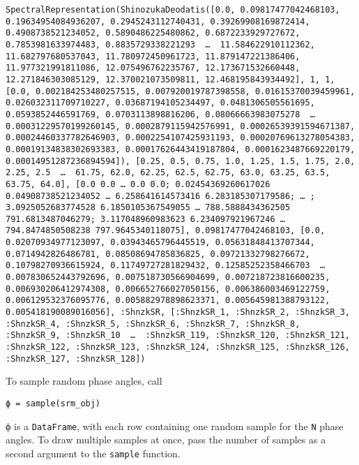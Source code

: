 \begin{verbatim}
SpectralRepresentation(ShinozukaDeodatis([0.0, 0.09817477042468103, 0.19634954084936207, 0.2945243112740431, 0.39269908169872414, 0.4908738521234052, 0.5890486225480862, 0.6872233929727672, 0.7853981633974483, 0.8835729338221293  …  11.584622910112362, 11.682797680537043, 11.780972450961723, 11.879147221386406, 11.977321991811086, 12.075496762235767, 12.173671532660448, 12.271846303085129, 12.370021073509811, 12.468195843934492], 1, 1, [0.0, 0.002184253480257515, 0.007920019787398558, 0.01615370039459961, 0.026032311709710227, 0.03687194105234497, 0.0481306505561695, 0.0593852446591769, 0.0703113898816206, 0.08066663983075278  …  0.00031229570199260145, 0.0002879115942576991, 0.00026539391594671387, 0.00024460337782646903, 0.0002254107425931193, 0.00020769613278054383, 0.00019134838302693383, 0.00017626443419187804, 0.0001623487669220179, 0.00014951287236894594]), [0.25, 0.5, 0.75, 1.0, 1.25, 1.5, 1.75, 2.0, 2.25, 2.5  …  61.75, 62.0, 62.25, 62.5, 62.75, 63.0, 63.25, 63.5, 63.75, 64.0], [0.0 0.0 … 0.0 0.0; 0.02454369260617026 0.04908738521234052 … 6.258641614573416 6.283185307179586; … ; 3.0925052683774528 6.1850105367549055 … 788.5888434362505 791.6813487046279; 3.117048960983623 6.234097921967246 … 794.8474850508238 797.9645340118075], 0.09817477042468103, [0.0, 0.02070934977123097, 0.03943465796445519, 0.05631848413707344, 0.0714942826486781, 0.08508694785836825, 0.09721332798276672, 0.10798270936615924, 0.11749727281829432, 0.12585252358466703  …  0.007830652443792696, 0.007518730566904699, 0.007218723816600235, 0.006930206412974308, 0.006652766027050156, 0.006386003469122759, 0.006129532376095776, 0.005882978898623371, 0.005645981388793122, 0.005418190089016056], :ShnzkSR, [:ShnzkSR_1, :ShnzkSR_2, :ShnzkSR_3, :ShnzkSR_4, :ShnzkSR_5, :ShnzkSR_6, :ShnzkSR_7, :ShnzkSR_8, :ShnzkSR_9, :ShnzkSR_10  …  :ShnzkSR_119, :ShnzkSR_120, :ShnzkSR_121, :ShnzkSR_122, :ShnzkSR_123, :ShnzkSR_124, :ShnzkSR_125, :ShnzkSR_126, :ShnzkSR_127, :ShnzkSR_128])
\end{verbatim}



To sample random phase angles, call




\begin{verbatim}
ϕ = sample(srm_obj)
\end{verbatim}



ϕ is a \texttt{DataFrame}, with each row containing one random sample for the \texttt{N} phase angles. To draw multiple samples at once, pass the number of samples as a second argument to the \texttt{sample} function.



